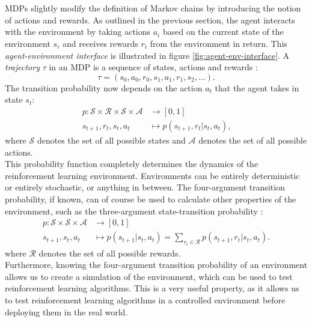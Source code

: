 \\
\\
MDPs slightly modify the definition of Markov chains by introducing the notion of actions and rewards.
As outlined in the previous section, the agent interacts with the environment by taking actions $a_i$ based on the current state of the environment $s_i$ and receives rewards $r_i$ from the environment in return.
This \textit{agent-environment interface} is illustrated in figure \ref{fig:agent-env-interface}.
A \textit{trajectory} $\tau$ in an MDP is a sequence of states, actions and rewards \cite[48]{sutton_reinforcement_nodate}:
\begin{equation}
    \tau = (s_0, a_0, r_0, s_1, a_1, r_1, s_2, \dots) \text{.}
    \label{eq:trajectory}
\end{equation}
The transition probability now depends on the action $a_t$ that the agent takes in state $s_t$:
\begin{align}
    p: \mathcal{S} \times \mathcal{R} \times \mathcal{S} \times \mathcal{A} &\rightarrow [0, 1] \nonumber \\
    s_{t+1}, r_t, s_t, a_t &\mapsto p(s_{t+1}, r_t | s_t, a_t) \text{,}
    \label{eq:transition-probability}
\end{align}
where $\mathcal{S}$ denotes the set of all possible states and $\mathcal{A}$ denotes the set of all possible actions.\\
This probability function completely determines the dynamics of the reinforcement learning environment.
Environments can be entirely deterministic or entirely stochastic, or anything in between.
The four-argument transition probability, if known, can of course be used to calculate other properties of the environment, such as the three-argument state-transition probability \cite[49]{sutton_reinforcement_nodate}:
\begin{align}
    p: \mathcal{S} \times \mathcal{S} \times \mathcal{A} &\rightarrow [0, 1] \nonumber \\
    s_{t+1}, s_t, a_t &\mapsto p(s_{t+1} | s_t, a_t) = \sum_{r_t \in \mathcal{R}} p(s_{t+1}, r_t | s_t, a_t) \text{.}
    \label{eq:state-transition-probability}
\end{align}
where $\mathcal{R}$ denotes the set of all possible rewards.\\
Furthermore, knowing the four-argument transition probability of an environment allows us to create a simulation of the environment, which can be used to test reinforcement learning algorithms.
This is a very useful property, as it allows us to test reinforcement learning algorithms in a controlled environment before deploying them in the real world.\\

